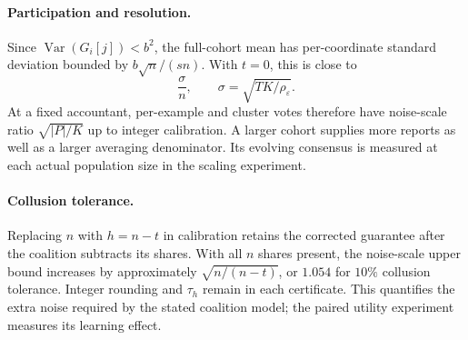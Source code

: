 \paragraph{Participation and resolution.}
Since $\operatorname{Var}(G_i[j])<b^2$, the full-cohort mean has per-coordinate
standard deviation bounded by $b\sqrt n/(sn)$. With $t=0$, this is close to
\begin{equation}
\frac{\sigma}{n},\qquad
\sigma=\sqrt{TK/\rho_\varepsilon}.\label{eq:design-budget}
\end{equation}
At a fixed accountant, per-example and cluster votes therefore have noise-scale
ratio $\sqrt{|P|/K}$ up to integer calibration. A larger cohort supplies more
reports as well as a larger averaging denominator. Its evolving consensus is
measured at each actual population size in the scaling experiment.

\paragraph{Collusion tolerance.}
Replacing $n$ with $h=n-t$ in calibration retains the corrected guarantee
after the coalition subtracts its shares. With all $n$ shares present, the
noise-scale upper bound increases by approximately $\sqrt{n/(n-t)}$,
or $1.054$ for $10\%$ collusion tolerance. Integer rounding and
$\tau_h$ remain in each certificate. This quantifies the extra noise required
by the stated coalition model; the paired utility experiment measures
its learning effect.
